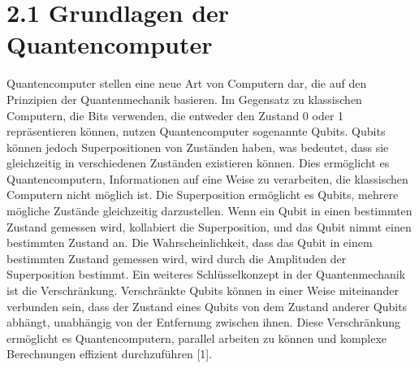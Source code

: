 \section{2.1 Grundlagen der Quantencomputer}
Quantencomputer stellen eine neue Art von Computern dar, die auf den Prinzipien der Quantenmechanik basieren. Im Gegensatz zu klassischen Computern, die Bits verwenden, die entweder den Zustand 0 oder 1 repräsentieren können, nutzen Quantencomputer sogenannte Qubits. Qubits können jedoch Superpositionen von Zuständen haben, was bedeutet, dass sie gleichzeitig in verschiedenen Zuständen existieren können. Dies ermöglicht es Quantencomputern, Informationen auf eine Weise zu verarbeiten, die klassischen Computern nicht möglich ist.
Die Superposition ermöglicht es Qubits, mehrere mögliche Zustände gleichzeitig darzustellen. Wenn ein Qubit in einen bestimmten Zustand gemessen wird, kollabiert die Superposition, und das Qubit nimmt einen bestimmten Zustand an. Die Wahrscheinlichkeit, dass das Qubit in einem bestimmten Zustand gemessen wird, wird durch die Amplituden der Superposition bestimmt.
Ein weiteres Schlüsselkonzept in der Quantenmechanik ist die Verschränkung. Verschränkte Qubits können in einer Weise miteinander verbunden sein, dass der Zustand eines Qubits von dem Zustand anderer Qubits abhängt, unabhängig von der Entfernung zwischen ihnen. Diese Verschränkung ermöglicht es Quantencomputern, parallel arbeiten zu können und komplexe Berechnungen effizient durchzuführen [1].

